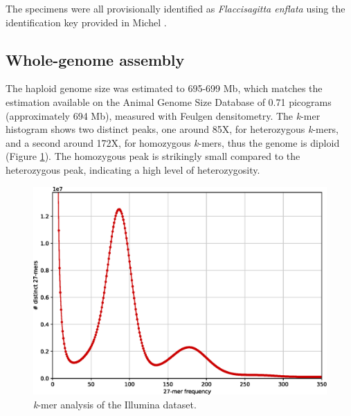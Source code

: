 The specimens were all provisionally identified as \textit{Flaccisagitta enflata} using the identification key provided in Michel \cite{michel1984}. 

\subsection{Whole-genome assembly}

The haploid genome size was estimated to 695-699 Mb, which matches the estimation available on the Animal Genome Size Database \cite{animal_genome_size} of 0.71 picograms (approximately 694 Mb), measured with Feulgen densitometry. The \textit{k}-mer histogram shows two distinct peaks, one around 85X, for heterozygous \textit{k}-mers, and a second around 172X, for homozygous \textit{k}-mers, thus the genome is diploid (Figure \ref{fig:fenflata_kat_hist}). The homozygous peak is strikingly small compared to the heterozygous peak, indicating a high level of heterozygosity. 

\begin{figure}
    \centering
    \includegraphics[width=1\linewidth]{fig/fenflata_kat_illumina.eps}
    \caption{\textit{k}-mer analysis of the Illumina dataset.}
    \label{fig:fenflata_kat_hist}
\end{figure}

